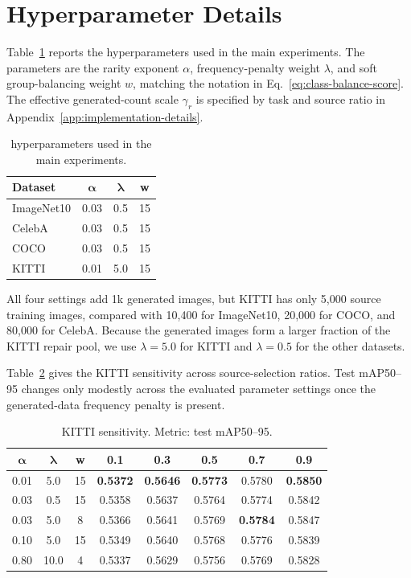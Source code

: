\section{Hyperparameter Details}
\label{app:hyperparameter-details}
Table~\ref{tab:rpc-hyperparameters} reports the \model hyperparameters used in the main experiments. The parameters are the rarity exponent $\alpha$, frequency-penalty weight $\lambda$, and soft group-balancing weight $w$, matching the notation in Eq.~\ref{eq:class-balance-score}. The effective generated-count scale $\gamma_r$ is specified by task and source ratio in Appendix~\ref{app:implementation-details}.

\begin{table}[t]
\centering
\caption{\model hyperparameters used in the main experiments.}
\label{tab:rpc-hyperparameters}
\small
\setlength{\tabcolsep}{5pt}
\begin{tabular}{l c c c}
\toprule
\rowcolor{sectiongray} \textbf{Dataset} & $\boldsymbol{\alpha}$ & $\boldsymbol{\lambda}$ & \textbf{w} \\
\midrule
ImageNet10 & 0.03 & 0.5 & 15 \\
CelebA & 0.03 & 0.5 & 15 \\
COCO & 0.03 & 0.5 & 15 \\
KITTI & 0.01 & 5.0 & 15 \\
\bottomrule
\end{tabular}
\end{table}

All four settings add 1k generated images, but KITTI has only 5,000 source training images, compared with 10,400 for ImageNet10, 20,000 for COCO, and 80,000 for CelebA. Because the generated images form a larger fraction of the KITTI repair pool, we use $\lambda=5.0$ for KITTI and $\lambda=0.5$ for the other datasets.

Table~\ref{tab:kitti-rpc-sensitivity} gives the KITTI sensitivity across source-selection ratios. Test mAP50--95 changes only modestly across the evaluated parameter settings once the generated-data frequency penalty is present.

\begin{table}[t]
\centering
\caption{KITTI \model sensitivity. Metric: test mAP50--95.}
\label{tab:kitti-rpc-sensitivity}
\small
\setlength{\tabcolsep}{4pt}
\begin{tabular}{c c c c c c c c}
\toprule
\rowcolor{sectiongray} $\boldsymbol{\alpha}$ & $\boldsymbol{\lambda}$ & \textbf{w} & \textbf{0.1} & \textbf{0.3} & \textbf{0.5} & \textbf{0.7} & \textbf{0.9} \\
\midrule
0.01 & 5.0 & 15 & \textbf{0.5372} & \textbf{0.5646} & \textbf{0.5773} & 0.5780 & \textbf{0.5850} \\
0.03 & 0.5 & 15 & 0.5358 & 0.5637 & 0.5764 & 0.5774 & 0.5842 \\
0.03 & 5.0 & 8 & 0.5366 & 0.5641 & 0.5769 & \textbf{0.5784} & 0.5847 \\
0.10 & 5.0 & 15 & 0.5349 & 0.5640 & 0.5768 & 0.5776 & 0.5839 \\
0.80 & 10.0 & 4 & 0.5337 & 0.5629 & 0.5756 & 0.5769 & 0.5828 \\
\bottomrule
\end{tabular}
\end{table}

